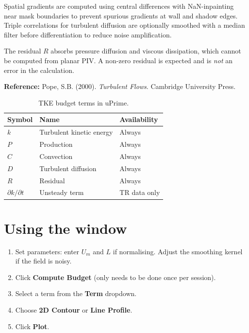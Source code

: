 \documentclass[11pt, a4paper]{report}
\newcommand{\uipth}[1]{\textbf{\textcolor{upblue}{#1}}}
\newcommand{\software}[1]{\textsf{#1}}
\begin{document}
Spatial gradients are computed using central differences with NaN-inpainting near mask boundaries to prevent spurious gradients at wall and shadow edges. Triple correlations for turbulent diffusion are optionally smoothed with a median filter before differentiation to reduce noise amplification.

\begin{notebox}
The residual $R$ absorbs pressure diffusion and viscous dissipation, which cannot be computed from planar PIV. A non-zero residual is expected and is \emph{not} an error in the calculation.
\end{notebox}

\noindent\textbf{Reference:} Pope, S.B. (2000). \textit{Turbulent Flows}. Cambridge University Press.

\begin{table}[htbp]
\centering
\caption{TKE budget terms in \software{uPrime}.}
\begin{tabular}{lll}
\toprule
\textbf{Symbol} & \textbf{Name} & \textbf{Availability} \\
\midrule
$k$                     & Turbulent kinetic energy  & Always \\
$P$                     & Production                & Always \\
$C$                     & Convection                & Always \\
$D$                     & Turbulent diffusion       & Always \\
$R$                     & Residual                  & Always \\
$\partial k/\partial t$ & Unsteady term             & TR data only \\
\bottomrule
\end{tabular}
\end{table}

\section{Using the window}

\begin{stepbox}
\begin{enumerate}[leftmargin=1.5em, topsep=2pt]
  \item Set parameters: enter $U_m$ and $L$ if normalising. Adjust the smoothing kernel if the field is noisy.
  \item Click \uipth{Compute Budget} (only needs to be done once per session).
  \item Select a term from the \uipth{Term} dropdown.
  \item Choose \uipth{2D Contour} or \uipth{Line Profile}.
  \item Click \uipth{Plot}.
\end{enumerate}
\end{stepbox}
\end{document}
